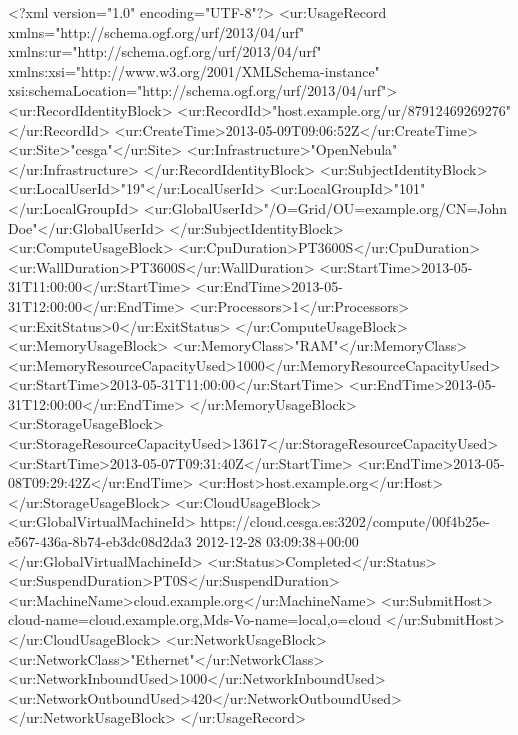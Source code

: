 \begin{XMLexample}
<?xml version="1.0" encoding="UTF-8"?>
<ur:UsageRecord xmlns="http://schema.ogf.org/urf/2013/04/urf"
    xmlns:ur="http://schema.ogf.org/urf/2013/04/urf"
    xmlns:xsi="http://www.w3.org/2001/XMLSchema-instance"
    xsi:schemaLocation="http://schema.ogf.org/urf/2013/04/urf">
    <ur:RecordIdentityBlock>
        <ur:RecordId>"host.example.org/ur/87912469269276"</ur:RecordId>
        <ur:CreateTime>2013-05-09T09:06:52Z</ur:CreateTime>
        <ur:Site>"cesga"</ur:Site>
        <ur:Infrastructure>"OpenNebula"</ur:Infrastructure>
    </ur:RecordIdentityBlock>
    <ur:SubjectIdentityBlock>
        <ur:LocalUserId>"19"</ur:LocalUserId>
        <ur:LocalGroupId>"101"</ur:LocalGroupId>
        <ur:GlobalUserId>"/O=Grid/OU=example.org/CN=John Doe"</ur:GlobalUserId>
    </ur:SubjectIdentityBlock>
    <ur:ComputeUsageBlock>
        <ur:CpuDuration>PT3600S</ur:CpuDuration>
        <ur:WallDuration>PT3600S</ur:WallDuration>
        <ur:StartTime>2013-05-31T11:00:00</ur:StartTime>
        <ur:EndTime>2013-05-31T12:00:00</ur:EndTime>
        <ur:Processors>1</ur:Processors>
        <ur:ExitStatus>0</ur:ExitStatus>
    </ur:ComputeUsageBlock>
    <ur:MemoryUsageBlock>
        <ur:MemoryClass>"RAM"</ur:MemoryClass>
        <ur:MemoryResourceCapacityUsed>1000</ur:MemoryResourceCapacityUsed>
        <ur:StartTime>2013-05-31T11:00:00</ur:StartTime>
        <ur:EndTime>2013-05-31T12:00:00</ur:EndTime>
    </ur:MemoryUsageBlock>
    <ur:StorageUsageBlock>
        <ur:StorageResourceCapacityUsed>13617</ur:StorageResourceCapacityUsed>
        <ur:StartTime>2013-05-07T09:31:40Z</ur:StartTime>
        <ur:EndTime>2013-05-08T09:29:42Z</ur:EndTime>
        <ur:Host>host.example.org</ur:Host>
    </ur:StorageUsageBlock>
    <ur:CloudUsageBlock>
        <ur:GlobalVirtualMachineId>
            https://cloud.cesga.es:3202/compute/00f4b25e-e567-436a-8b74-eb3dc08d2da3 2012-12-28 03:09:38+00:00
        </ur:GlobalVirtualMachineId>
        <ur:Status>Completed</ur:Status>
        <ur:SuspendDuration>PT0S</ur:SuspendDuration>
        <ur:MachineName>cloud.example.org</ur:MachineName>
        <ur:SubmitHost>
            cloud-name=cloud.example.org,Mds-Vo-name=local,o=cloud
        </ur:SubmitHost>
    </ur:CloudUsageBlock>
    <ur:NetworkUsageBlock>
        <ur:NetworkClass>"Ethernet"</ur:NetworkClass>
        <ur:NetworkInboundUsed>1000</ur:NetworkInboundUsed>
        <ur:NetworkOutboundUsed>420</ur:NetworkOutboundUsed>
    </ur:NetworkUsageBlock>
</ur:UsageRecord>
\end{XMLexample}

